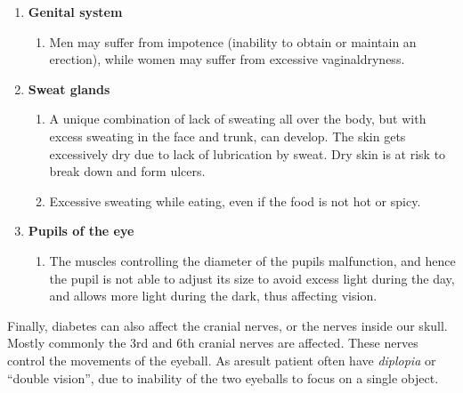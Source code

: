 \begin{enumerate}[•]
\begin{enumerate}[o]
\itemsep=0pt
\item The bladder muscles get paralyzed, and fail to empty the bladder, even when the bladder becomes full. As a result, urine may overflow, causing social embarrassment.
\item The bladder muscles may not contract properly to empty the\break bladder completely when urinating. So a small amount of urine is left behind in the bladder, and this creates the urge to urinate again and again.
\item Due to the stagnation of urine in the bladder, there is a higher risk of bladder infections.
\end{enumerate}
\item \textbf{Genital system}
\begin{enumerate}[o]
\itemsep=0pt
\item Men may suffer from impotence (inability to obtain or maintain an erection), while women may suffer from excessive vaginal\break dryness.
\end{enumerate}
\item \textbf{Sweat glands}
\begin{enumerate}[o]
\itemsep=0pt
\item A unique combination of lack of sweating all over the body, but with excess sweating in the face and trunk, can develop. The skin gets excessively dry due to lack of lubrication by sweat. Dry skin is at risk to break down and form ulcers.
\item Excessive sweating while eating, even if the food is not hot or spicy.
\end{enumerate}
\item \textbf{Pupils of the eye}
\begin{enumerate}[o]
\itemsep=0pt
\item The muscles controlling the diameter of the pupils malfunction, and hence the pupil is not able to adjust its size to avoid excess light during the day, and allows more light during the dark, thus affecting vision.
\end{enumerate}
\end{enumerate}

Finally, diabetes can also affect the cranial nerves, or the nerves inside our skull. Mostly commonly the 3rd and 6th cranial nerves are affected. These nerves control the movements of the eyeball. As a\break result patient often have \textit{diplopia} or “double vision”, due to inability of the two eyeballs to focus on a single object.

